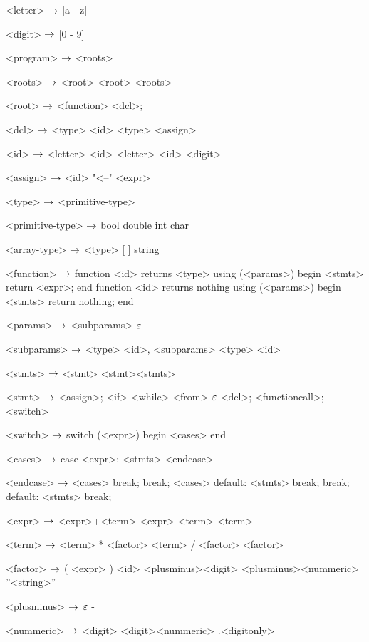 



\begin{grammar}
<letter> $\rightarrow$ [a - z]
	\alt [A - Z]

<digit> $\rightarrow$ [0 - 9]

<program> $\rightarrow$ <roots>

<roots> $\rightarrow$ <root>
\alt <root> <roots>

<root> $\rightarrow$ <function>
\alt <dcl>;

<dcl> $\rightarrow$ <type> <id>
\alt <type> <assign>

<id> $\rightarrow$ <letter>
	\alt<id> <letter>
	\alt<id> <digit>

<assign>  $\rightarrow$ <id> "<--" <expr>

<type> $\rightarrow$ <primitive-type>

<primitive-type> $\rightarrow$ bool
\alt double
\alt int
\alt char

<array-type> $\rightarrow$ <type> [ ]
\alt string

<function> $\rightarrow$  function <id> returns <type> using (<params>)
begin
	<stmts>
	return <expr>;
end
\alt function <id> returns nothing using (<params>)
begin
	<stmts>
	return nothing;
end

<params> $\rightarrow$ <subparams>
	\alt $\varepsilon$

<subparams> $\rightarrow$ <type> <id>, <subparams>
\alt <type> <id>

<stmts> $\rightarrow$ <stmt>
	\alt <stmt><stmts>

<stmt> $\rightarrow$ <assign>;
	\alt <if>
	\alt <while>
	\alt <from>
	\alt $\varepsilon$
	\alt <dcl>;
	\alt <functioncall>;
	\alt <switch>

<switch> $\rightarrow$ switch (<expr>)
		begin
			<cases>
		end

<cases> $\rightarrow$ case <expr>:
			<stmts>
		<endcase>
		
<endcase> $\rightarrow$ <cases>
		\alt break;
		\alt break;
		<cases>
		\alt default:
			<stmts>
			break;
		\alt break;
		default:
			<stmts>
			break;

<expr> $\rightarrow$ <expr>+<term>
	\alt<expr>-<term>
	\alt<term>

<term> $\rightarrow$ <term> * <factor>
	\alt <term> / <factor>
	\alt <factor>

<factor> $\rightarrow$ ( <expr> )
	\alt <id>
	\alt <plusminus><digit>
	\alt <plusminus><nummeric>
	\alt ''<string>''

<plusminus> $\rightarrow$ $\varepsilon$
	\alt -

<nummeric> $\rightarrow$ <digit>
	\alt <digit><nummeric>
	\alt .<digitonly>


\end{grammar}
